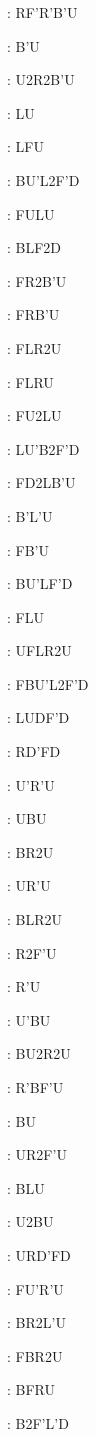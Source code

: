 \documentclass[9pt]{article}
\begin{document}
{\begin{multicols}{6}
: RF'R'B'U

: B'U

: U2R2B'U

: LU

: LFU

: BU'L2F'D

: FULU

: BLF2D

: FR2B'U

: FRB'U

: FLR2U

: FLRU

: FU2LU

: LU'B2F'D

: FD2LB'U

: B'L'U

: FB'U

: BU'LF'D

: FLU

: UFLR2U

: FBU'L2F'D

: LUDF'D

: RD'FD

: U'R'U

: UBU

: BR2U

: UR'U

: BLR2U

: R2F'U

: R'U

: U'BU

: BU2R2U

: R'BF'U

: BU

: UR2F'U

: BLU

: U2BU

: URD'FD

: FU'R'U

: BR2L'U

: FBR2U

: BFRU

: B2F'L'D


\end{multicols}}
\end{document}
